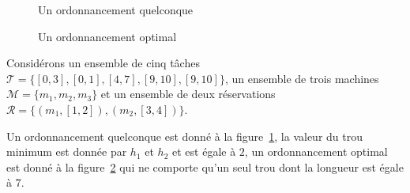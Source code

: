 \documentclass[a4paper,9pt]{report}
\begin{document}
\begin{figure}
    \begin{center}
        \begin{ordo}[10]{3}{1}{10}


        \end{ordo}
    \end{center}
    \caption{Un ordonnancement quelconque}
    \label{ex1ordquelc}
\end{figure}
            
\begin{figure}
    \begin{center}
        \begin{ordo}[10]{3}{1}{10}


        \end{ordo}
    \end{center}
    \caption{Un ordonnancement optimal}
    \label{ex1ordopt}
\end{figure}

\begin{ex}
    Considérons un ensemble de cinq tâches $\mathcal{T} = \{[0, 3], [0,1], [4,7],
    [9,10], [9,10]\}$, un ensemble de trois machines $\mathcal{M} = \{m_1, m_2, m_3\}$ et un
    ensemble de deux réservations $\mathcal{R} = \{(m_1, [1,2]), (m_2, [3,4])\}$.

    Un ordonnancement quelconque est donné à la figure~\ref{ex1ordquelc}, la valeur du trou minimum
    est donnée par $h_1$ et $h_2$ et est égale à $2$, un ordonnancement optimal est donné à la
    figure~\ref{ex1ordopt} qui ne comporte qu'un seul trou dont la longueur est égale à $7$.
\end{ex}
\end{document}
